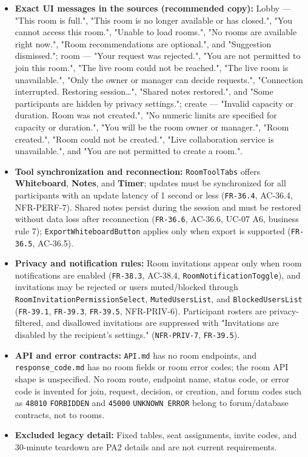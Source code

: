 \documentclass[12pt]{article}
\begin{document}
\begin{itemize}
\item \textbf{Exact UI messages in the sources (recommended copy):} Lobby --- "This room is full.", "This room is no longer available or has closed.", "You cannot access this room.", "Unable to load rooms.", "No rooms are available right now.", "Room recommendations are optional.", and "Suggestion dismissed."; room --- "Your request was rejected.", "You are not permitted to join this room.", "The live room could not be reached.", "The live room is unavailable.", "Only the owner or manager can decide requests.", "Connection interrupted. Restoring session…", "Shared notes restored.", and "Some participants are hidden by privacy settings."; create --- "Invalid capacity or duration. Room was not created.", "No numeric limits are specified for capacity or duration.", "You will be the room owner or manager.", "Room created.", "Room could not be created.", "Live collaboration service is unavailable.", and "You are not permitted to create a room.".
\item \textbf{Tool synchronization and reconnection:} \texttt{RoomToolTabs} offers \textbf{Whiteboard}, \textbf{Notes}, and \textbf{Timer}; updates must be synchronized for all participants with an update latency of 1 second or less (\texttt{FR-36.4}, AC-36.4, NFR-PERF-7). Shared notes persist during the session and must be restored without data loss after reconnection (\texttt{FR-36.6}, AC-36.6, UC-07 A6, business rule 7); \texttt{ExportWhiteboardButton} applies only when export is supported (\texttt{FR-36.5}, AC-36.5).
\item \textbf{Privacy and notification rules:} Room invitations appear only when room notifications are enabled (\texttt{FR-38.3}, AC-38.4, \texttt{RoomNotificationToggle}), and invitations may be rejected or users muted/blocked through \texttt{RoomInvitationPermissionSelect}, \texttt{MutedUsersList}, and \texttt{BlockedUsersList} (\texttt{FR-39.1}, \texttt{FR-39.3}, \texttt{FR-39.5}, NFR-PRIV-6). Participant rosters are privacy-filtered, and disallowed invitations are suppressed with "Invitations are disabled by the recipient's settings." (\texttt{NFR-PRIV-7}, \texttt{FR-39.5}).
\item \textbf{API and error contracts:} \texttt{API.md} has no room endpoints, and \texttt{response\_code.md} has no room fields or room error codes; the room API shape is unspecified. No room route, endpoint name, status code, or error code is invented for join, request, decision, or creation, and forum codes such as \texttt{48010} \texttt{FORBIDDEN} and \texttt{45000} \texttt{UNKNOWN ERROR} belong to forum/database contracts, not to rooms.
\item \textbf{Excluded legacy detail:} Fixed tables, seat assignments, invite codes, and 30-minute teardown are PA2 details and are not current requirements.
\end{itemize}
\par\medskip
\end{document}
